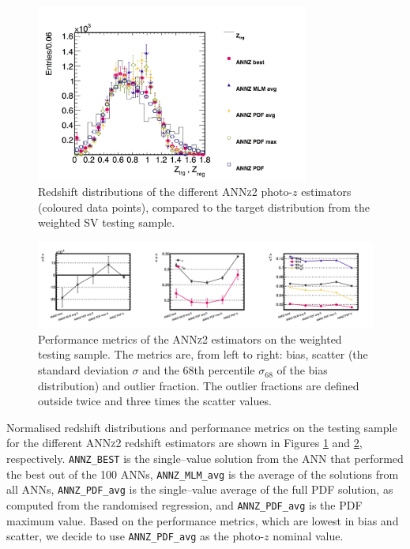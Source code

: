 \begin{figure}\centering \includegraphics[width=0.8\textwidth]{./chapters/chapter2/figs/regTrgZ.png}\caption{Redshift distributions of the different \textsc{ANNz2} photo-$z$ estimators (coloured data points), compared to the target distribution from the weighted SV testing sample.}\label{fig:annznz}\end{figure}
\begin{figure} \includegraphics[width=1.05\textwidth]{./chapters/chapter2/figs/avgMetric.png}\caption{Performance metrics of the \textsc{ANNz2} estimators on the weighted testing sample. The metrics are, from left to right: bias, scatter (the standard deviation $\sigma$ and the 68th percentile $\sigma_{68}$ of the bias distribution) and outlier fraction. The outlier fractions are defined outside twice and three times the scatter values. }\label{fig:annzmetric}\end{figure}

Normalised redshift distributions and performance metrics on the testing sample for the different \textsc{ANNz2} redshift estimators are shown in Figures \ref{fig:annznz} and \ref{fig:annzmetric}, respectively. \texttt{ANNZ\_BEST} is the single--value solution from the ANN that performed the best out of the 100 ANNs, \texttt{ANNZ\_MLM\_avg} is the average of the solutions from all ANNs, \texttt{ANNZ\_PDF\_avg} is the single--value average of the full PDF solution, as computed from the randomised regression, and \texttt{ANNZ\_PDF\_avg} is the PDF maximum value. Based on the performance metrics, which are lowest in bias and scatter, we decide to use \texttt{ANNZ\_PDF\_avg} as the photo-$z$ nominal value.


